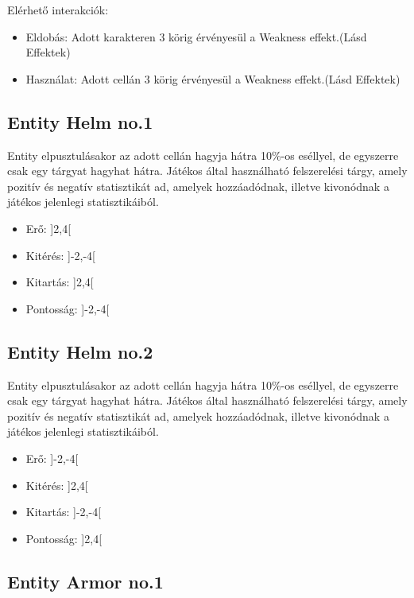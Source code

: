 \noindent Elérhető interakciók:
\begin{itemize}
    \item Eldobás: Adott karakteren 3 körig érvényesül a Weakness effekt.(Lásd Effektek)
    \item Használat: Adott cellán 3 körig érvényesül a Weakness effekt.(Lásd Effektek)
\end{itemize}

\subsection{Entity Helm no.1}

Entity elpusztulásakor az adott cellán hagyja hátra 10\%-os eséllyel, de egyszerre csak egy tárgyat hagyhat hátra.
Játékos által használható felszerelési tárgy, amely pozitív és negatív statisztikát ad, amelyek hozzáadódnak, illetve kivonódnak a játékos jelenlegi statisztikáiból.

\begin{itemize}
    \item Erő: ]2,4[
    \item Kitérés: ]-2,-4[
    \item Kitartás: ]2,4[
    \item Pontosság: ]-2,-4[
\end{itemize}

\subsection{Entity Helm no.2}

Entity elpusztulásakor az adott cellán hagyja hátra 10\%-os eséllyel, de egyszerre csak egy tárgyat hagyhat hátra.
Játékos által használható felszerelési tárgy, amely pozitív és negatív statisztikát ad, amelyek hozzáadódnak, illetve kivonódnak a játékos jelenlegi statisztikáiból.

\begin{itemize}
    \item Erő: ]-2,-4[
    \item Kitérés: ]2,4[
    \item Kitartás: ]-2,-4[
    \item Pontosság: ]2,4[
\end{itemize}

\subsection{Entity Armor no.1}

